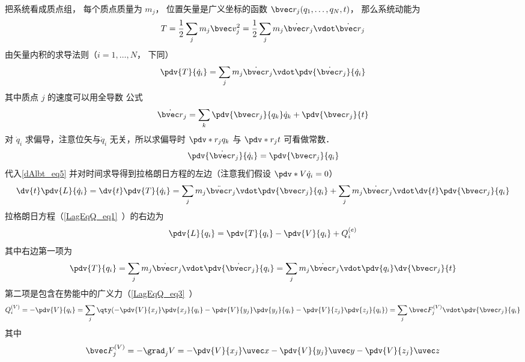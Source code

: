 把系统看成质点组， 每个质点质量为 $m_j$， 位置矢量是广义坐标的函数 $\bvec r_j(q_1,\dots,q_N,t)$， 那么系统动能为
\begin{equation}
T = \frac12 \sum_j m_j \bvec v_j^2 = \frac12 \sum_j m_j \dot{\bvec r}_j \vdot \dot{\bvec r}_j
\end{equation}
由矢量内积的求导法则（$i=1,\dots,N$， 下同）
\begin{equation}\label{dAlbt_eq5}
\pdv{T}{\dot q_i} = \sum_j m_j \dot{\bvec r}_j \vdot \pdv{\dot{\bvec r}_j}{\dot q_i}
\end{equation}
其中质点 $j$ 的速度可以用全导数 公式
\begin{equation}
\dot{\bvec r}_j = \sum_k \pdv{\bvec r_j}{q_k} \dot q_k  + \pdv{\bvec r_j}{t}
\end{equation}
对 $\dot q_i$ 求偏导，注意位矢与$\dot q_i$ 无关，所以求偏导时 $\pdv*{r_j}{q_k}$ 与 $\pdv*{r_j}{t}$ 可看做常数．
\begin{equation}\label{dAlbt_eq27}
\pdv{\dot{\bvec r}_j}{\dot q_i} = \pdv{\bvec r_j}{q_i}
\end{equation}
代入\autoref{dAlbt_eq5} 并对时间求导得到拉格朗日方程的左边（注意我们假设 $\pdv*{V}{\dot q_i} = 0$）
\begin{equation}\label{dAlbt_eq8}
\dv{t} \pdv{L}{\dot q_i} = \dv{t} \pdv{T}{\dot q_i} = \sum_j m_j \ddot{\bvec r}_j \vdot \pdv{\bvec r_j}{q_i}  + \sum_j m_j \dot{\bvec r}_j \vdot \dv{t} \pdv{\bvec r_j}{q_i}
\end{equation}
拉格朗日方程（\autoref{LagEqQ_eq1}~）的右边为
\begin{equation}
\pdv{L}{q_i} = \pdv{T}{q_i} - \pdv{V}{q_i} + Q_i^{(e)}
\end{equation}
其中右边第一项为
\begin{equation}\label{dAlbt_eq28}
\pdv{T}{q_i} = \sum_j m_j \dot{\bvec r}_j \vdot \pdv{\dot{\bvec r}_j}{q_i} = \sum_j m_j \dot{\bvec r}_j \vdot \pdv{q_i} \dv{\bvec r_j}{t}
\end{equation}
第二项是包含在势能中的广义力（\autoref{LagEqQ_eq3}~）
\begin{equation}\label{dAlbt_eq29}
Q_i^{(V)} = - \pdv{V}{q_i} = \sum_j \qty(-\pdv{V}{x_j} \pdv{x_j}{q_i} - \pdv{V}{y_j}\pdv{y_j}{q_i} - \pdv{V}{z_j} \pdv{z_j}{q_i}) = \sum_j \bvec F_j^{(V)} \vdot \pdv{\bvec r_j}{q_i}
\end{equation}
其中
\begin{equation}\label{dAlbt_eq2}
\bvec F_j^{(V)} = - \grad_j V = -\pdv{V}{x_j}\uvec x - \pdv{V}{y_j}\uvec y - \pdv{V}{z_j} \uvec z
\end{equation}
